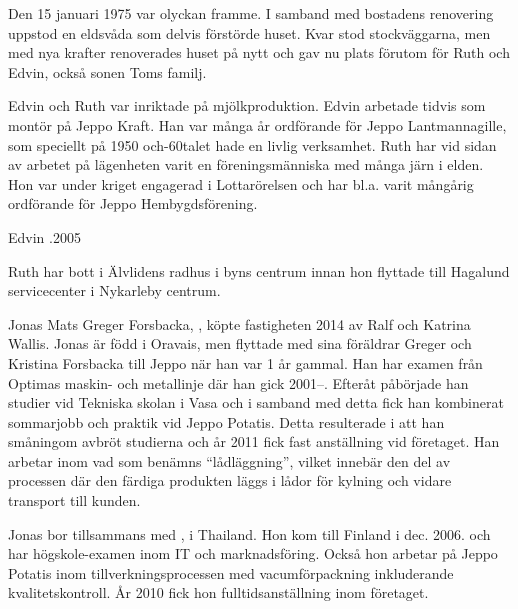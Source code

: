 Den 15 januari 1975 var olyckan framme. I samband med bostadens renovering uppstod en eldsvåda som delvis förstörde huset. Kvar stod
stockväggarna, men med nya krafter renoverades huset på nytt och gav nu plats förutom för Ruth och Edvin, också sonen Toms familj.

Edvin och Ruth var inriktade på mjölkproduktion. Edvin arbetade tidvis som montör på Jeppo Kraft. Han var många år ordförande för Jeppo Lantmannagille, som speciellt på 1950 och-60talet hade en livlig verksamhet. Ruth har vid sidan av arbetet på lägenheten varit en föreningsmänniska med många järn i elden. Hon var under kriget engagerad i Lottarörelsen och har bl.a. varit mångårig ordförande för Jeppo Hembygdsförening.

Edvin .2005

Ruth har bott i Älvlidens radhus i byns centrum innan hon flyttade till Hagalund servicecenter i Nykarleby centrum.






Jonas Mats Greger Forsbacka, , köpte fastigheten 2014 av Ralf och Katrina Wallis. Jonas är född i Oravais, men flyttade med sina föräldrar Greger och Kristina Forsbacka till Jeppo när han var 1 år gammal. Han har examen från Optimas  maskin- och metallinje där han gick 2001--. Efteråt påbörjade han studier vid Tekniska skolan i Vasa och i samband med detta fick han kombinerat sommarjobb och praktik vid Jeppo Potatis. Detta resulterade i att han småningom avbröt studierna och år 2011 fick fast anställning vid företaget. Han arbetar inom vad som benämns ``lådläggning'', vilket innebär den del av processen där den färdiga produkten läggs i lådor för kylning och vidare transport till kunden.

Jonas bor tillsammans med ,  i Thailand. Hon kom till Finland i dec. 2006. och har högskole-examen inom IT och marknadsföring. Också hon arbetar på Jeppo Potatis inom tillverkningsprocessen med vacumförpackning inkluderande kvalitetskontroll. År 2010 fick hon fulltidsanställning inom företaget.


